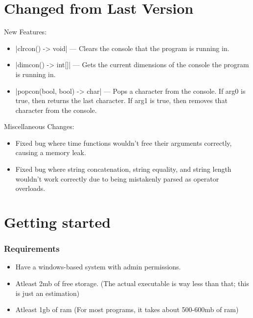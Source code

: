 \documentclass[12pt, letterpaper, oneside]{article}
\begin{document}
	\section{Changed from Last Version}
		New Features:
		\begin{itemize}
			\item[--] \spverb|clrcon() -> void| --- Clears the console that the program is running in.
			\item[--] \spverb|dimcon() -> int[]| --- Gets the current dimensions of the console the program is running in. 
			\item[--] \spverb|popcon(bool, bool) -> char| --- Pops a character from the console. If arg0 is true, then returns the last character. If arg1 is true, then removes that character from the console.
		\end{itemize}
		Miscellaneous Changes:
		\begin{itemize}
			\item[--] Fixed bug where time functions wouldn't free their arguments correctly, causing a memory leak.
			\item[--] Fixed bug where string concatenation, string equality, and string length wouldn't work correctly due to being mistakenly parsed as operator overloads.
			
		\end{itemize}
	\newpage
	\section{Getting started}
		\subsubsection{Requirements}
			\begin{itemize}
				\item[--] Have a windows-based system with admin permissions.
				\item[--] Atleast 2mb of free storage. (The actual executable is way less than that; this is just an estimation)
				\item[--] Atleast 1gb of ram (For most programs, it takes about 500-600mb of ram)
			\end{itemize}
\end{document}
